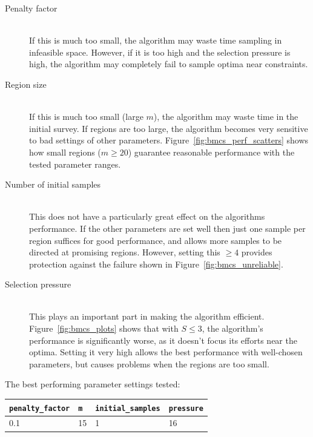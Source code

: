 \documentclass[10pt]{article}
\begin{document}
\begin{description}
  \item[Penalty factor] \hfill \\
    If this is much too small, the algorithm may waste time sampling in
    infeasible space. However, if it is too high and the selection pressure is
    high, the algorithm may completely fail to sample optima near constraints.

  \item[Region size] \hfill \\
    If this is much too small (large $m$), the algorithm may waste time in the
    initial survey. If regions are too large, the algorithm becomes very
    sensitive to bad settings of other parameters.
    Figure~\ref{fig:bmcs_perf_scatters} shows how small regions ($m \geq 20$)
    guarantee reasonable performance with the tested parameter ranges.

  \item[Number of initial samples] \hfill \\
    This does not have a particularly great effect on the algorithms
    performance. If the other parameters are set well then just one sample
    per region suffices for good performance, and allows more samples to be
    directed at promising regions. However, setting this $\geq 4$ provides
    protection against the failure shown in Figure~\ref{fig:bmcs_unreliable}.

  \item[Selection pressure] \hfill \\
    This plays an important part in making the algorithm efficient.
    Figure~\ref{fig:bmcs_plots} shows that with $S \leq 3$, the algorithm's
    performance is significantly worse, as it doesn't focus its efforts near
    the optima. Setting it very high allows the best performance with
    well-chosen parameters, but causes problems when the regions are too
    small.

\end{description}

The best performing parameter settings tested:

\vspace{5pt}

\begin{tabular}{llll}
  \texttt{penalty\_factor} & 
  \texttt{m} &
  \texttt{initial\_samples} &
  \texttt{pressure} \\
  \hline
  0.1 & 15 & 1 & 16 \\
  \end{tabular}
\end{document}

